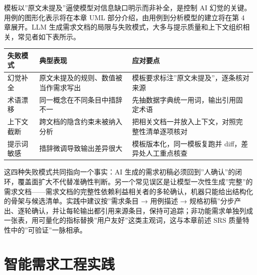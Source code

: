 \documentclass[12pt,a4paper,twoside,openany]{ctexbook}
\numberwithin{figure}{chapter}
\numberwithin{table}{chapter}
\newcounter{none}
\begin{document}
模板以''原文未提及''逼使模型对信息缺口明示而非补全，是控制 AI
幻觉的关键。用例的图形化表示将在本章 UML
部分介绍，由用例到分析模型的建立将在第 4 章展开。LLM
生成需求文档的局限与失败模式，大多与提示质量和上下文组织相关，常见者如下表所示。

{\def\LTcaptype{none} %
\begin{longtable}[]{@{}
  >{\raggedright\arraybackslash}p{}
  >{\raggedright\arraybackslash}p{}
  >{\raggedright\arraybackslash}p{}@{}}
\toprule\noalign{}
\begin{minipage}[b]{\linewidth}\raggedright
失败模式
\end{minipage} & \begin{minipage}[b]{\linewidth}\raggedright
典型表现
\end{minipage} & \begin{minipage}[b]{\linewidth}\raggedright
应对要点
\end{minipage} \\
\midrule\noalign{}
\endhead
\bottomrule\noalign{}
\endlastfoot
幻觉补全 & 原文未提及的规则、数值被当作需求写出 &
模板要求标注''原文未提及''，逐条核对来源 \\
术语漂移 & 同一概念在不同条目中措辞不一 &
先抽数据字典统一用词，输出引用固定术语 \\
上下文截断 & 跨文档的隐含约束未被纳入分析 &
把相关文档一并放入上下文，对照完整性清单逐项核对 \\
提示词敏感 & 措辞微调导致输出差异很大 & 模板版本化，同一模板复跑并
diff，差异处人工重点核查 \\
\end{longtable}
}

这四种失败模式共同指向一个事实：AI
生成的需求初稿必须回到''人确认''的闭环，覆盖面扩大不代替准确性判断。另一个常见误区是让模型一次性生成''完整''的需求文档------需求文档的完整性依赖利益相关者的多轮确认，机器只能给出结构化的骨架与候选清单。实践中建议按''需求条目
→ 用例描述 →
规格初稿''分步产出、逐轮确认，并让每轮输出都引用来源条目，保持可追踪；非功能需求单独列成一张表，用可量化的指标替换''用户友好''这类主观词，这与本章前述
SRS 质量特性中的''可验证''一脉相承。

\section{智能需求工程实践}\label{ux667aux80fdux9700ux6c42ux5de5ux7a0bux5b9eux8df5}
\end{document}
